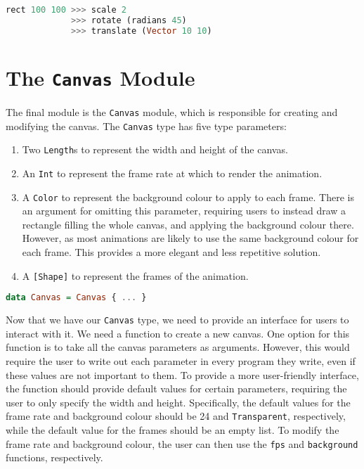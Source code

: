 \documentclass[../main.tex]{subfiles}
\begin{document}
                \begin{lstlisting}[language={Haskell}]
rect 100 100 >>> scale 2
             >>> rotate (radians 45)
             >>> translate (Vector 10 10)\end{lstlisting}

    \section{The \texttt{Canvas}
        Module} The final module is the \texttt{Canvas} module, which is responsible
            for creating and modifying the canvas.
        The \texttt{Canvas} type has five type parameters:
        \begin{enumerate}
            \item Two \texttt{Length}s to represent the width and height of the canvas.
            \item An \texttt{Int} to represent the frame rate at which to render the animation.
            \item A \texttt{Color} to represent the background colour to apply to each frame.
                  There is an argument for omitting this parameter, requiring users to instead
                      draw a rectangle filling the whole canvas, and applying the background colour
                      there.
                  However, as most animations are likely to use the same background colour for
                      each frame.
                  This provides a more elegant and less repetitive solution.
            \item A \texttt{[Shape]} to represent the frames of the animation.
        \end{enumerate}

        \begin{lstlisting}[language={Haskell}, label={lst:canvas}, caption={The \texttt{Canvas} type definition.}]
data Canvas = Canvas { ... }\end{lstlisting}

        Now that we have our \texttt{Canvas} type, we need to provide an interface for
            users to interact with it.
        We need a function to create a new canvas.
        One option for this function is to take all the canvas parameters as arguments.
        However, this would require the user to write out each parameter in every
            program they write, even if these values are not important to them.
        To provide a more user-friendly interface, the function should provide default
            values for certain parameters, requiring the user to only specify the width and
            height.
        Specifically, the default values for the frame rate and background colour
            should be 24 and \texttt{Transparent}, respectively, while the default value
            for the frames should be an empty list.
        To modify the frame rate and background colour, the user can then use the
            \texttt{fps} and \texttt{background} functions, respectively.
\end{document}
